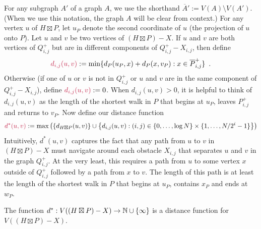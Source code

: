 \documentclass{patmorin}
\makeatletter
\def\mathcolor#1#{\@mathcolor{#1}}
\def\@mathcolor#1#2#3{%
  \protect\leavevmode
  \begingroup
    \color#1{#2}#3%
  \endgroup
}
\newcommand{\mathdefin}[1]{\mathcolor{brightmaroon}{#1}}
\makeatother
\begin{document}
For any subgraph $A'$ of a graph $A$, we use the shorthand $\overline{A}':=V(A)\setminus V(A')$. (When we use this notation, the graph $A$ will be clear from context.)
For any vertex $u$ of $H\boxtimes P$, let $u_P$ denote the second coordinate of $u$ (the projection of $u$ onto $P$).  Let $u$ and $v$ be two vertices of $(H\boxtimes P)-X$.  If $u$ and $v$ are both vertices of $Q^+_{i,j}$ but are in different components of $Q^+_{i,j}-X_{i,j}$, then define
\[
  \mathdefin{d_{i,j}(u,v)}:=\min \{d_P(u_P,x) + d_P(x,v_P):x\in \overline{P}^+_{i,j}\} \enspace .
\]
Otherwise (if one of $u$ or $v$ is not in $Q^+_{i,j}$ or $u$ and $v$ are in the same component of $Q^+_{i,j}-X_{i,j}$), define $\mathdefin{d_{i,j}(u,v)}:=0$.  When $d_{i,j}(u,v)>0$, it is helpful to think of $d_{i,j}(u,v)$ as the length of the shortest walk in $P$ that begins at $u_P$, leaves $P^+_{i,j}$ and returns to $v_P$.  Now define our distance function
\[
  \mathdefin{d^*(u,v)}:=\max\left(\{d_{H\boxtimes P}(u,v)\}\cup \left\{d_{i,j}(u,v):(i,j)\in\{0,\ldots,\log N\}\times\{1,\ldots,N/2^i-1\}\right\}\right)
\]
Intuitively, $d^*(u,v)$ captures the fact that any path from $u$ to $v$ in $(H\boxtimes P)-X$ must navigate around each obstacle $X_{i,j}$ that separates $u$ and $v$ in the graph $Q^+_{i,j}$.  At the very least, this requires a path from $u$ to some vertex $x$ outside of $Q^+_{i,j}$ followed by a path from $x$ to $v$.  The length of this path is at least the length of the shortest walk in $P$ that begins at $u_P$, contains $x_P$ and ends at $w_P$.

\begin{clm}\label{d_star_distance}
  The function $d^*:V((H\boxtimes P)-X)\to\mathbb{N}\cup\{\infty\}$ is a distance function for $V((H\boxtimes P)-X)$.
\end{clm}
\end{document}
